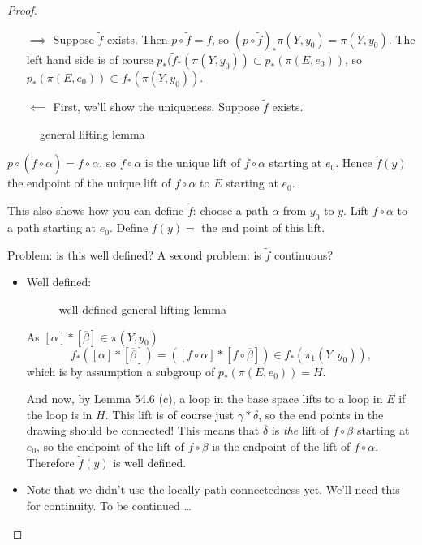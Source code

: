 \begin{proof}
    \begin{itemize}
        \item[$\implies$] Suppose $\tilde{f}$ exists.
            Then $p  \circ  \tilde{f} = f$, so $(p  \circ  \tilde{f})_* \pi(Y, y_0) = \pi(Y, y_0)$.
            The left hand side is of course $p_*(\tilde{f}_*(\pi(Y, y_0)) \subset p_*(\pi(E, e_0))$, so $p_*(\pi(E, e_0)) \subset f_*(\pi(Y, y_0))$.
        \item[$\impliedby$]
            First, we'll show the uniqueness.
            Suppose $\tilde{f}$ exists.
    \end{itemize}

\begin{figure}[H]
    \centering
    \caption{general lifting lemma}
    \label{fig:general-lifting-lemma}
\end{figure}

$p  \circ  (\tilde{f}  \circ  \alpha) = f  \circ  \alpha$, so $\tilde{f}  \circ  \alpha$ is the unique lift of $f  \circ \alpha$ starting at $e_0$.
Hence $\tilde{f}(y)$ the endpoint of the unique lift of $f  \circ \alpha$ to $E$ starting at $e_0$.

This also shows how you can define $\tilde{f}$: choose a path $\alpha$ from $y_0$ to $y$. Lift $f  \circ \alpha$ to a path starting at $e_0$. Define $\tilde{f}(y) = $ the end point of this lift.

Problem: is this well defined?  A second problem: is $\tilde{f}$ continuous?
\begin{itemize}
    \item Well defined:

\begin{figure}[H]
    \centering
    \caption{well defined general lifting lemma}
    \label{fig:well-defined-general-lifting-lemma}
\end{figure}
As $[\alpha] * [\overline{\beta}] \in \pi(Y, y_0)$
\[
    f_*([\alpha] * [\overline{\beta}]) = ([f  \circ \alpha] * [f  \circ  \overline{\beta}]) \in f_*(\pi_1(Y, y_0))
,\] 
which is by assumption a subgroup of $p_*(\pi(E, e_0)) = H$.

And now, by Lemma 54.6 (c), a loop in the base space lifts to a loop in $E$ if the loop is in $H$.
This lift is of course just $\gamma*\delta$, so the end points in the drawing should be connected!
This means that $\overline{\delta}$ is \emph{the} lift of $f  \circ  \beta$ starting at $e_0$, so the endpoint of the lift of $f  \circ \beta$ is the endpoint of the lift of $f  \circ  \alpha$.
Therefore $\tilde{f}(y)$ is well defined.

\item Note that we didn't use the locally path connectedness yet. We'll need this for continuity.
    To be continued \ldots
\end{itemize}
\end{proof}
